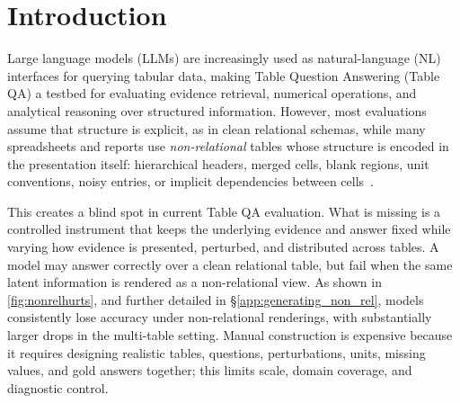 \section{Introduction}
\label{sec:intro}
Large language models (LLMs) are increasingly used as natural-language (NL) interfaces for querying tabular data, making Table Question Answering (Table QA) a testbed for evaluating evidence retrieval, numerical operations, and analytical reasoning over structured information. However, most evaluations assume that structure is explicit, as in clean relational schemas, while many spreadsheets and reports use \emph{non-relational} tables whose structure is encoded in the presentation itself: hierarchical headers, merged cells, blank regions, unit conventions, noisy entries, or implicit dependencies between cells~\cite{1.10}.

This creates a blind spot in current Table QA evaluation. What is missing is a controlled instrument that keeps the underlying evidence and answer fixed while varying how evidence is presented, perturbed, and distributed across tables. A model may answer correctly over a clean relational table, but fail when the same latent information is rendered as a non-relational view. As shown in \autoref{fig:nonrelhurts}, and further detailed in \S\ref{app:generating_non_rel}, models consistently lose accuracy under non-relational renderings, with substantially larger drops in the multi-table setting. Manual construction is expensive because it requires designing realistic tables, questions, perturbations, units, missing values, and gold answers together; this limits scale, domain coverage, and diagnostic control.



